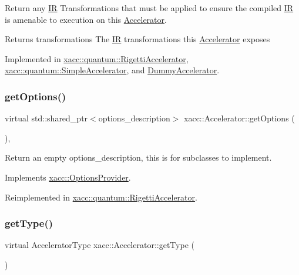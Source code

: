 Return any \hyperlink{a01148}{IR} Transformations that must be applied to ensure the compiled \hyperlink{a01148}{IR} is amenable to execution on this \hyperlink{a01084}{Accelerator}.

\begin{DoxyReturn}{Returns}
transformations The \hyperlink{a01148}{IR} transformations this \hyperlink{a01084}{Accelerator} exposes 
\end{DoxyReturn}


Implemented in \hyperlink{a00916_a443683a1dfb000603c640b2ee303cf66}{xacc\+::quantum\+::\+Rigetti\+Accelerator}, \hyperlink{a00944_afc49c9e7973ba6c6ff9761c36198323d}{xacc\+::quantum\+::\+Simple\+Accelerator}, and \hyperlink{a00976_aac0e2ae753064701468fa1188ac7549f}{Dummy\+Accelerator}.

\mbox{\label{a01084_a98c9eda6b54367c75667ecfbbf167979}} 
\subsubsection{\texorpdfstring{get\+Options()}{getOptions()}}
{\footnotesize\ttfamily virtual std\+::shared\+\_\+ptr$<$options\+\_\+description$>$ xacc\+::\+Accelerator\+::get\+Options (\begin{DoxyParamCaption}{ }\end{DoxyParamCaption})\hspace{0.3cm}{\ttfamily [inline]}, {\ttfamily [virtual]}}

Return an empty options\+\_\+description, this is for subclasses to implement. 

Implements \hyperlink{a01192_a6d150954f852109bfe2c1ae90222926f}{xacc\+::\+Options\+Provider}.



Reimplemented in \hyperlink{a00916_a9ee9e62aecbccf193894ca3388676f9f}{xacc\+::quantum\+::\+Rigetti\+Accelerator}.

\mbox{\label{a01084_aaffc3e4bb9880eb5041b1b58ee4c2665}} 
\subsubsection{\texorpdfstring{get\+Type()}{getType()}}
{\footnotesize\ttfamily virtual Accelerator\+Type xacc\+::\+Accelerator\+::get\+Type (\begin{DoxyParamCaption}{ }\end{DoxyParamCaption})\hspace{0.3cm}{\ttfamily [pure virtual]}}

